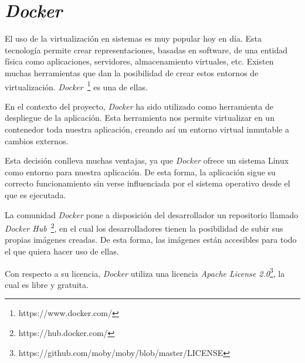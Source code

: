 \documentclass[a4paper, 12pt]{book}
\begin{document}
\section{\textit{Docker}} 
\label{sec:docker}

El uso de la virtualización en sistemas es muy popular hoy en día. Esta
tecnología permite crear representaciones, basadas en software, de una
entidad física como aplicaciones, servidores, almacenamiento virtuales,
etc. Existen muchas herramientas que dan la posibilidad de crear estos
entornos de virtualización. \textit{Docker}~\footnote{https://www.docker.com/} es
una de ellas.

En el contexto del proyecto, \textit{Docker} ha sido utilizado como herramienta
de despliegue de la aplicación. Esta herramienta nos permite virtualizar
en un contenedor toda nuestra aplicación, creando así un entorno virtual
inmutable a cambios externos.

Esta decisión conlleva muchas ventajas, ya que \textit{Docker} ofrece un sistema
Linux como entorno para nuestra aplicación. De esta forma, la aplicación
sigue su correcto funcionamiento sin verse influenciada por el sistema
operativo desde el que es ejecutada.

La comunidad \textit{Docker} pone a disposición del desarrollador un repositorio
llamado \textit{Docker Hub}~\footnote{https://hub.docker.com/}, en el cual
los desarrolladores tienen la posibilidad de subir sus propias imágenes
creadas. De esta forma, las imágenes están accesibles para todo el que
quiera hacer uso de ellas.

Con respecto a su licencia, \textit{Docker} utiliza una licencia
\textit{Apache License 2.0}\footnote{https://github.com/moby/moby/blob/master/LICENSE},
la cual es libre y gratuita.
\end{document}
